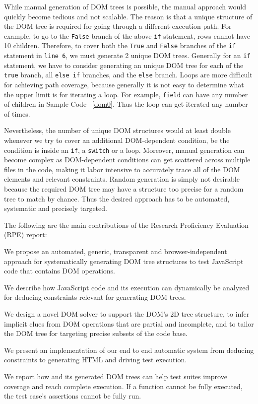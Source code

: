 While manual generation of DOM trees is possible, the manual approach would quickly become tedious and not scalable.  
The reason is that a unique structure of the DOM tree is required for going through a different execution path.  
For example, to go to the {\tt False} branch of the above {\tt if} statement, rows cannot have 10 children.
Therefore, to cover both the {\tt True} and {\tt False} branches of the {\tt if} statement in {\tt line 6}, we must generate 2 unique DOM trees.  
Generally for an {\tt if} statement, we have to consider generating an unique DOM tree for each of the {\tt true} branch,  all {\tt else if} branches, and the {\tt else} branch.  
Loops are more difficult for achieving path coverage, because generally it is not easy to determine what the upper limit is for iterating a loop.  
For example, {\tt field} can have any number of children in Sample Code ~\ref{dom0}.  Thus the loop can get iterated any number of times.  


Nevertheless, the number of unique DOM structures would at least double whenever we try to cover an additional DOM-dependent condition, be the condition is inside an {\tt if}, a {\tt switch} or a loop.  
Moreover, manual generation can become complex as DOM-dependent conditions can get scattered across multiple files in the code, making it labor intensive to accurately trace all of the DOM elements and relevant constraints.  
Random generation is simply not desirable because the required DOM tree may have a structure too precise for a random tree to match by chance.  
Thus the desired approach has to be automated, systematic and precisely targeted.


The following are the main contributions of the Research Proficiency Evaluation (RPE) report:
\begin {compactitem}
\item We propose an automated, generic, transparent and browser-independent approach for systematically generating DOM tree structures to test JavaScript code that contains DOM operations.
\item We describe how JavaScript code and its execution can dynamically be analyzed for deducing constraints relevant for generating DOM trees.
\item We design a novel DOM solver to support the DOM's 2D tree structure, to infer implicit clues from DOM operations that are partial and incomplete, and to tailor the DOM tree for targeting precise subsets of the code base.
\item We present an implementation of our end to end automatic system from deducing constraints to generating HTML and driving test execution.
\item We report how \tool and its generated DOM trees can help test suites improve coverage and reach complete execution.  If a function cannot be fully executed, the test case's assertions cannot be fully run.  
\end {compactitem}

